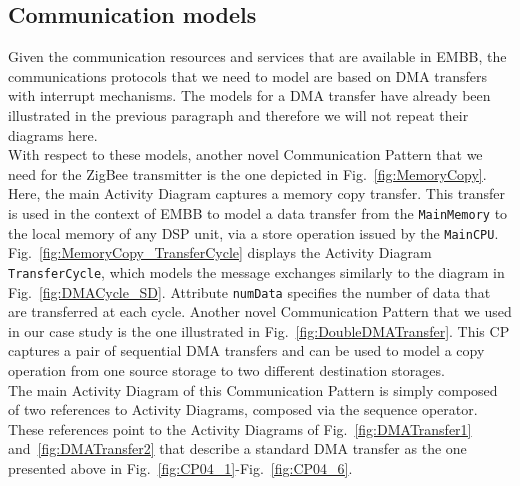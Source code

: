 \documentclass{llncs}
\begin{document}
\subsection{Communication models}

Given the communication resources and services that are available in EMBB, the communications protocols that we need to model are
based on DMA transfers with interrupt mechanisms. The models for a DMA transfer have already been illustrated in the
previous paragraph and therefore we will not repeat their diagrams here.\\
%
With respect to these models, another novel Communication Pattern that we need for the ZigBee transmitter is the one depicted in
Fig.~\ref{fig:MemoryCopy}. Here, the main Activity Diagram captures a memory
copy transfer. This transfer is used in the context of EMBB to model a data transfer from the \texttt{MainMemory} to the local memory of any DSP unit, via a store operation issued by
the \texttt{MainCPU}. Fig.~\ref{fig:MemoryCopy_TransferCycle} displays the Activity Diagram \texttt{TransferCycle}, which models
the message exchanges similarly to the diagram in Fig.~\ref{fig:DMACycle_SD}. Attribute \texttt{numData} specifies the number of
data that are transferred at each cycle.
%
Another novel Communication Pattern that we used in our case study is the one illustrated in Fig.~\ref{fig:DoubleDMATransfer}.
This CP captures a pair of sequential DMA transfers and can be used to model a copy operation from one source storage to two
different destination storages.\\
%
The main Activity Diagram of this Communication Pattern is simply composed of two references to Activity Diagrams, composed via
the sequence operator. These references point to the Activity Diagrams of Fig.~\ref{fig:DMATransfer1} and~\ref{fig:DMATransfer2}
that describe a standard DMA transfer as the one presented above in Fig.~\ref{fig:CP04_1}-Fig.~\ref{fig:CP04_6}.
%
%
\end{document}
